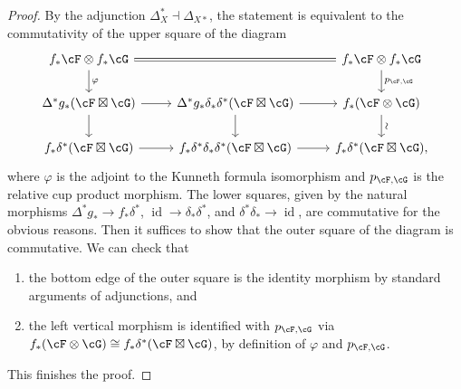 \documentclass[12pt]{amsart}
\numberwithin{equation}{section}
\theoremstyle{plain}
\theoremstyle{definition}
\DeclareMathOperator{\id}{\mathrm{id}}
\begin{document}
\begin{proof}
    By the adjunction $\Delta_X^* \dashv \Delta_{X*}$,
    the statement is equivalent to the commutativity of the upper square of the diagram
    \[
        \begin{tikzcd}
            f_*\cF \otimes f_*\cG \arrow[rr, equal]\arrow[d, "\varphi"]&&f_*\cF \otimes f_*\cG\arrow[d, "p_{\cF, \cG}"]\\
            \Delta^*g_*(\cF \boxtimes \cG) \arrow[r]\dar&\Delta^*g_*\delta_*\delta^*(\cF \boxtimes \cG) \arrow[r]\dar&f_*(\cF \otimes \cG)\dar["\sim", sloped]\\
            f_*\delta^*(\cF \boxtimes \cG) \rar & f_*\delta^*\delta_*\delta^*(\cF\boxtimes \cG) \rar & f_*\delta^*(\cF \boxtimes \cG),
        \end{tikzcd}
    \]
    where $\varphi$ is the adjoint to the Kunneth formula isomorphism and $p_{\cF, \cG}$ is the relative cup product morphism.
    The lower squares, given by the natural morphisms $\Delta^*g_* \to f_*\delta^*$,
    $\id \to \delta_*\delta^*$,
    and $\delta^*\delta_* \to \id$, are commutative for the obvious reasons.
    Then it suffices to show that the outer square of the diagram is commutative.
    We can check that
    \begin{enumerate}
        \item the bottom edge of the outer square is the identity morphism by standard arguments of adjunctions, and
        \item the left vertical morphism is identified with $p_{\cF, \cG}$ via $f_*(\cF \otimes \cG) \cong f_*\delta^*(\cF \boxtimes \cG)$, by definition of $\varphi$ and $p_{\cF, \cG}$.
    \end{enumerate}
    This finishes the proof.
\end{proof}
\end{document}
